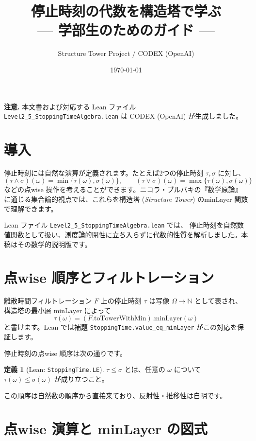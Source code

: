 \documentclass[12pt]{ltjsarticle}
\title{停止時刻の代数を構造塔で学ぶ\\{\large --- 学部生のためのガイド ---}}
\author{Structure Tower Project / CODEX (OpenAI)}
\date{\today}
\theoremstyle{definition}
\newtheorem{definition}{定義}[section]
\theoremstyle{plain}
\begin{document}
\maketitle
\tableofcontents

\bigskip
\begin{center}
  \textbf{注意.} 本文書および対応する Lean ファイル
  \texttt{Level2\_5\_StoppingTimeAlgebra.lean} は CODEX (OpenAI) が生成しました。
\end{center}

\section{導入}

停止時刻には自然な演算が定義されます。たとえば2つの停止時刻 $\tau,\sigma$ に対し、
\[
  (\tau \wedge \sigma)(\omega)=\min\{\tau(\omega),\sigma(\omega)\},\qquad
  (\tau \vee \sigma)(\omega)=\max\{\tau(\omega),\sigma(\omega)\}
\]
などの点wise 操作を考えることができます。ニコラ・ブルバキの『数学原論』に通じる集合論的視点では、これらを構造塔 (\emph{Structure Tower}) のminLayer 関数で理解できます。

Lean ファイル \texttt{Level2\_5\_StoppingTimeAlgebra.lean} では、
停止時刻を自然数値関数として扱い、測度論的閉性に立ち入らずに代数的性質を解析しました。本稿はその数学的説明版です。

\section{点wise 順序とフィルトレーション}

離散時間フィルトレーション $F$ 上の停止時刻 $\tau$ は写像 $\Omega\to\mathbb{N}$ として表され、構造塔の最小層 $\mathrm{minLayer}$ によって
\[
  \tau(\omega) = (F.\mathrm{toTowerWithMin}).\mathrm{minLayer}(\omega)
\]
と書けます。Lean では補題 \texttt{StoppingTime.value\_eq\_minLayer} がこの対応を保証します。

停止時刻の点wise 順序は次の通りです。

\begin{definition}[Lean: \texttt{StoppingTime.LE}]
$\tau \le \sigma$ とは、任意の $\omega$ について $\tau(\omega)\le\sigma(\omega)$ が成り立つこと。
\end{definition}

この順序は自然数の順序から直接来ており、反射性・推移性は自明です。

\section{点wise 演算と minLayer の図式}
\end{document}
